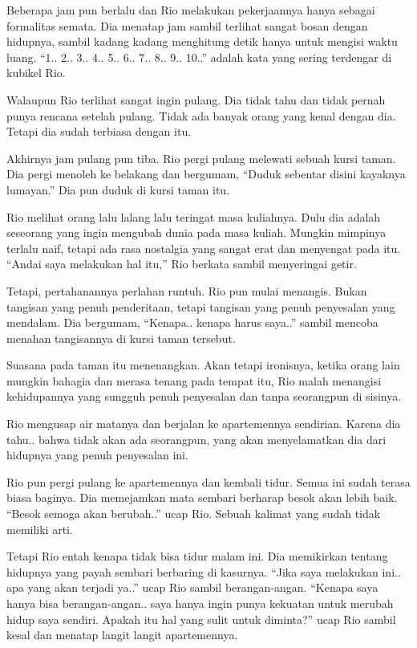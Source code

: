 Beberapa jam pun berlalu dan Rio melakukan pekerjaannya hanya sebagai formalitas semata. Dia menatap jam sambil terlihat sangat bosan dengan hidupnya, sambil kadang kadang menghitung detik hanya untuk mengisi waktu luang. ``1.. 2.. 3.. 4.. 5.. 6.. 7.. 8.. 9.. 10..'' adalah kata yang sering terdengar di kubikel Rio.


Walaupun Rio terlihat sangat ingin pulang. Dia tidak tahu dan tidak pernah punya rencana setelah pulang. Tidak ada banyak orang yang kenal dengan dia. Tetapi dia sudah terbiasa dengan itu.


Akhirnya jam pulang pun tiba. Rio pergi pulang melewati sebuah kursi taman. Dia pergi menoleh ke belakang dan bergumam, ``Duduk sebentar disini kayaknya lumayan.'' Dia pun duduk di kursi taman itu.


Rio melihat orang lalu lalang lalu teringat masa kuliahnya. Dulu dia adalah seseorang yang ingin mengubah dunia pada masa kuliah. Mungkin mimpinya terlalu naif, tetapi ada rasa nostalgia yang sangat erat dan menyengat pada itu. ``Andai saya melakukan hal itu,'' Rio berkata sambil menyeringai getir.


Tetapi, pertahanannya perlahan runtuh. Rio pun mulai menangis. Bukan tangisan yang penuh penderitaan, tetapi tangisan yang penuh penyesalan yang mendalam. Dia bergumam, ``Kenapa.. kenapa harus saya..'' sambil mencoba menahan tangisannya di kursi taman tersebut.


Suasana pada taman itu menenangkan. Akan tetapi ironisnya, ketika orang lain mungkin bahagia dan merasa tenang pada tempat itu, Rio malah menangisi kehidupannya yang sungguh penuh penyesalan dan tanpa seorangpun di sisinya.


Rio mengusap air matanya dan berjalan ke apartemennya sendirian. Karena dia tahu.. bahwa tidak akan ada seorangpun, yang akan menyelamatkan dia dari hidupnya yang penuh penyesalan ini.


Rio pun pergi pulang ke apartemennya dan kembali tidur. Semua ini sudah terasa biasa baginya. Dia memejamkan mata sembari berharap besok akan lebih baik. ``Besok semoga akan berubah..'' ucap Rio. Sebuah kalimat yang sudah tidak memiliki arti.


Tetapi Rio entah kenapa tidak bisa tidur malam ini. Dia memikirkan tentang hidupnya yang payah sembari berbaring di kasurnya. ``Jika saya melakukan ini.. apa yang akan terjadi ya..'' ucap Rio sambil berangan-angan. ``Kenapa saya hanya bisa berangan-angan.. saya hanya ingin punya kekuatan untuk merubah hidup saya sendiri. Apakah itu hal yang sulit untuk diminta?'' ucap Rio sambil kesal dan menatap langit langit apartemennya.


